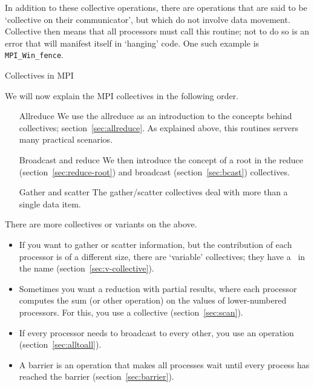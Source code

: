 In addition to these collective operations, there are operations that
are said to be `collective on their communicator', but which do not
involve data movement. Collective then means that all processors must
call this routine; not to do so is an error that will 
manifest itself in `hanging' code. One such example is
\lstinline$MPI_Win_fence$.

 {Collectives in MPI}

We will now explain the MPI collectives in the following order.
\begin{itemize}
\item[Allreduce] We use the allreduce as an introduction to the
  concepts behind collectives; section~\ref{sec:allreduce}. As
  explained above, this routines servers many practical scenarios.
\item[Broadcast and reduce] We then introduce the concept of a root
  in the reduce (section~\ref{sec:reduce-root}) and broadcast
  (section~\ref{sec:bcast}) collectives.
\item[Gather and scatter] The gather/scatter collectives deal with
  more than a single data item.
\end{itemize}

There are more collectives or variants on the above.
\begin{itemize}
\item If you want to gather or scatter information, but the contribution
  of each processor is of a different size, there are `variable' collectives;
  they have a~ in the name (section~\ref{sec:v-collective}).
\item Sometimes you want a reduction with partial results, where each processor
  computes the sum (or other operation) on the values of lower-numbered processors.
  For this, you use a  collective (section~\ref{sec:scan}).
\item If every processor needs to broadcast to every other, you use an
   operation (section~\ref{sec:alltoall}).
\item A barrier is an operation that makes all processes wait until every
  process has reached the barrier (section~\ref{sec:barrier}).
\end{itemize}

\begin{comment}
  Thus, MPI has the following operations:
  \begin{itemize}
  \item \indexmpishow{MPI_Allreduce} is equivalent to a
    \indexmpishow{MPI_Reduce} followed by a broadcast.
  \item \indexmpishow{MPI_Allgather} is equivalent to a
    \indexmpishow{MPI_Gather} followed by a broadcast.
  \item \indexmpishow{MPI_Allgatherv} is equivalent to an
    \indexmpishow{MPI_Gatherv} followed by a broadcast.
  \item \indexmpishow{MPI_Alltoall}, \indexmpishow{MPI_Alltoallv}.
  \end{itemize}
\end{comment}

